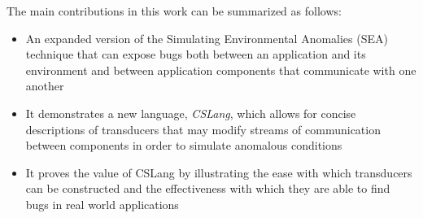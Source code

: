 
The main contributions in this work can be summarized as follows:

\begin{itemize}

\item{An expanded version of the Simulating Environmental Anomalies (SEA)
  technique that can expose bugs both between an application and its
    environment and between application components that communicate with
    one another}

\item{It demonstrates a new language, {\em CSLang},
which allows for concise descriptions of transducers that may
modify streams of communication between components in order to simulate
anomalous conditions}

\item{It proves the value of CSLang by illustrating the ease with which
  transducers can be constructed and the effectiveness with which they are
    able to find bugs in real world applications }

\end{itemize}
